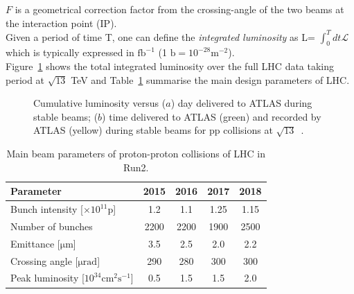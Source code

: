 $F$ is a geometrical correction factor from the crossing-angle of the two beams at the interaction point (IP). 
\\Given a period of time T, one can define the \textit{integrated luminosity} as L= $\int^{T}_{0}{dt \mathcal{L}}$ 
which is typically expressed in $\mathrm{fb^{-1}}$ (1 $\mathrm{b = 10^{-28} m^{-2}}$).
\\Figure~\ref{fig:lum} shows the total integrated luminosity over the full LHC data taking period at $\mathrm{\sqrt{13}}$ TeV and Table~\ref{tab:lum} summarise the main design parameters of LHC.
\begin{figure}[h]
	\centering
	\quad
	\quad
	\caption{Cumulative luminosity versus ($a$) day delivered to ATLAS during stable beams; ($b$) time delivered to ATLAS (green) and recorded by ATLAS (yellow) during stable beams for pp collisions at $\mathrm{\sqrt{13}}$~\cite{lumi}.}
	\label{fig:lum}
\end{figure}
\begin{table}[h]
	\begin{adjustbox}{max width=1.\textwidth,center}
		\begin{tabular}{lcccc}
			\hline 
			\textbf{Parameter}              											&  \textbf{2015} & \textbf{2016} 			& \textbf{2017} & \textbf{2018} \\ 
			\hline 
				Bunch intensity [$\mathrm{\times10^{11}p}$] 		  &  1.2 				  & 1.1 						  & 1.25 				& 1.15 				\\
				Number of bunches   												 &  2200 			   & 2200						 & 1900				  & 2500			\\
				Emittance [$\mathrm{\mu m}$] 							 	  & 3.5					  & 2.5 						  &2.0 					 & 2.2				 \\
				Crossing angle [$\mathrm{\mu rad}$] 					   & 290 				  & 280 						 & 300 				   & 300		      \\
				Peak luminosity [$\mathrm{10^{34} cm^{2}s^{-1}}$] 	& 0.5 					& 1.5 							& 1.5				   &  2.0				\\
			\hline  
		\end{tabular} 
	\end{adjustbox}
	\caption{Main beam parameters of proton-proton collisions of LHC in Run2.}
	\label{tab:lum}
\end{table} 
\FloatBarrier
